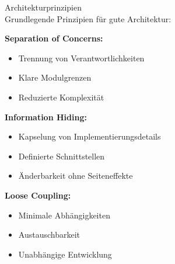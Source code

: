 \begin{theorem}{Architekturprinzipien}\\
Grundlegende Prinzipien für gute Architektur:

\textbf{Separation of Concerns:}
\begin{itemize}
    \item Trennung von Verantwortlichkeiten
    \item Klare Modulgrenzen
    \item Reduzierte Komplexität
\end{itemize}

\textbf{Information Hiding:}
\begin{itemize}
    \item Kapselung von Implementierungsdetails
    \item Definierte Schnittstellen
    \item Änderbarkeit ohne Seiteneffekte
\end{itemize}

\textbf{Loose Coupling:}
\begin{itemize}
    \item Minimale Abhängigkeiten
    \item Austauschbarkeit
    \item Unabhängige Entwicklung
\end{itemize}
\end{theorem}

